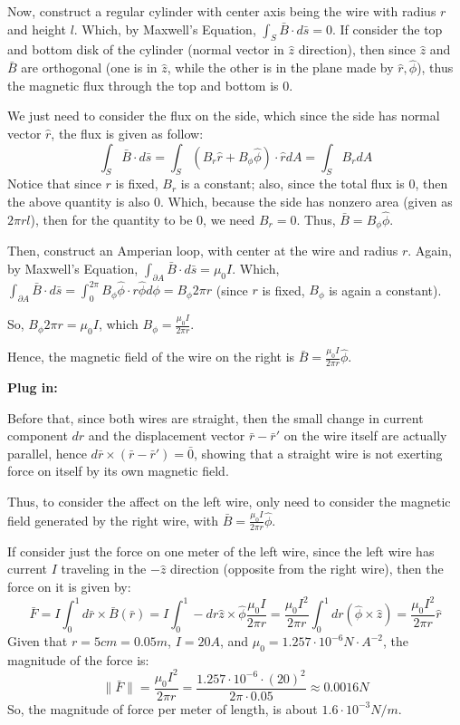 \documentclass{article}
\begin{document}
\hfill

Now, construct a regular cylinder with center axis being the wire with radius $r$ and height $l$. Which, by Maxwell's Equation, $\int_S\bar{B}\cdot d\bar{s} = 0$.
If consider the top and bottom disk of the cylinder (normal vector in $\hat{z}$ direction), then since $\hat{z}$ and $\bar{B}$ are orthogonal (one is in $\hat{z}$, while the other is in the plane made by $\hat{r},\hat{\phi}$),
thus the magnetic flux through the top and bottom is $0$.

We just need to consider the flux on the side, which since the side has normal vector $\hat{r}$, the flux is given as follow:
$$\int_{S}\bar{B}\cdot d\bar{s} = \int_{S}(B_r\hat{r}+B_\phi\hat{\phi})\cdot \hat{r}dA = \int_{S}B_rdA$$
Notice that since $r$ is fixed, $B_r$ is a constant; also, since the total flux is $0$, then the above quantity is also $0$.
Which, because the side has nonzero area (given as $2\pi rl$), then for the quantity to be $0$, we need $B_r = 0$.
Thus, $\bar{B}=B_\phi\hat{\phi}$.

\hfill

Then, construct an Amperian loop, with center at the wire and radius $r$. Again, by Maxwell's Equation, $\int_{\partial A}\bar{B}\cdot d\bar{s}=\mu_0I$.
Which, $\int_{\partial A}\bar{B}\cdot d\bar{s} = \int_{0}^{2\pi}B_\phi\hat{\phi}\cdot r\hat{\phi}d\phi = B_\phi 2\pi r$ (since $r$ is fixed, $B_\phi$ is again a constant).

So, $B_\phi 2\pi r = \mu_0 I$, which $B_\phi = \frac{\mu_0I}{2\pi r}$.

Hence, the magnetic field of the wire on the right is $\bar{B}=\frac{\mu_0I}{2\pi r}\hat{\phi}$.

\hfill

\textbf{Plug in:}

Before that, since both wires are straight, then the small change in current component $d\hat{r}$ and the displacement vector $\bar{r}-\bar{r}'$ on the wire itself are actually parallel,
hence $d\bar{r}\times (\bar{r}-\bar{r}')=\bar{0}$, showing that a straight wire is not exerting force on itself by its own magnetic field.

\hfill

Thus, to consider the affect on the left wire, only need to consider the magnetic field generated by the right wire, with $\bar{B}=\frac{\mu_0I}{2\pi r}\hat{\phi}$.

If consider just the force on one meter of the left wire, since the left wire has current $I$ traveling in the $-\hat{z}$ direction (opposite from the right wire),
then the force on it is given by:
$$\bar{F}=I\int_{0}^{1}d\bar{r}\times \bar{B}(\bar{r}) = I\int_{0}^{1}-dr\hat{z}\times \hat{\phi}\frac{\mu_0I}{2\pi r} = \frac{\mu_0I^2}{2\pi r}\int_{0}^{1}dr (\hat{\phi}\times \hat{z}) = \frac{\mu_0I^2}{2\pi r}\hat{r}$$
Given that $r=5cm = 0.05m$, $I=20A$, and $\mu_0 = 1.257\cdot 10^{-6}N\cdot A^{-2}$, the magnitude of the force is:
$$\|\bar{F}\|=\frac{\mu_0I^2}{2\pi r}=\frac{1.257\cdot 10^{-6}\cdot (20)^2}{2\pi \cdot 0.05} \approx 0.0016 N$$
So, the magnitude of force per meter of length, is about $1.6 \cdot 10^{-3}N/m$.
\end{document}
